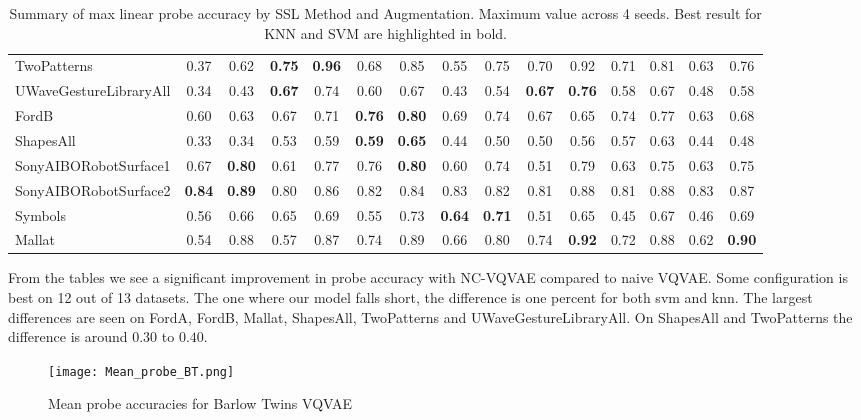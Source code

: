 \documentclass[../../thesis.tex]{subfiles}
\begin{document}
\begin{table}[H]
\begin{adjustbox}{width=\textwidth}
\begin{tabular}{lcc|cc|cc|cc|cc|cc|cc}
        TwoPatterns             & 0.37 & 0.62 & \textbf{0.75} & \textbf{0.96} & 0.68 & 0.85 & 0.55 & 0.75 & 0.70 & 0.92 & 0.71 & 0.81 & 0.63 & 0.76 \\
        UWaveGestureLibraryAll  & 0.34 & 0.43 & \textbf{0.67} & 0.74 & 0.60 & 0.67 & 0.43 & 0.54 & \textbf{0.67} & \textbf{0.76} & 0.58 & 0.67 & 0.48 & 0.58 \\
        FordB                   & 0.60 & 0.63 & 0.67 & 0.71 & \textbf{0.76} & \textbf{0.80} & 0.69 & 0.74 & 0.67 & 0.65 & 0.74 & 0.77 & 0.63 & 0.68 \\
        ShapesAll               & 0.33 & 0.34 & 0.53 & 0.59 & \textbf{0.59} & \textbf{0.65} & 0.44 & 0.50 & 0.50 & 0.56 & 0.57 & 0.63 & 0.44 & 0.48 \\
        SonyAIBORobotSurface1   & 0.67 & \textbf{0.80} & 0.61 & 0.77 & 0.76 & \textbf{0.80} & 0.60 & 0.74 & 0.51 & 0.79 & 0.63 & 0.75 & 0.63 & 0.75 \\
        SonyAIBORobotSurface2   & \textbf{0.84} & \textbf{0.89} & 0.80 & 0.86 & 0.82 & 0.84 & 0.83 & 0.82 & 0.81 & 0.88 & 0.81 & 0.88 & 0.83 & 0.87 \\
        Symbols                 & 0.56 & 0.66 & 0.65 & 0.69 & 0.55 & 0.73 & \textbf{0.64} & \textbf{0.71} & 0.51 & 0.65 & 0.45 & 0.67 & 0.46 & 0.69 \\
        Mallat                  & 0.54 & 0.88 & 0.57 & 0.87 & 0.74 & 0.89 & 0.66 & 0.80 & 0.74 & \textbf{0.92} & 0.72 & 0.88 & 0.62 & \textbf{0.90} \\


        \bottomrule
    \end{tabular}
    \end{adjustbox}
    
    \caption{Summary of max linear probe accuracy by SSL Method and Augmentation. Maximum value across 4 seeds. Best result for KNN and SVM are highlighted in bold.}
\end{table}

From the tables we see a significant improvement in probe accuracy with NC-VQVAE compared to naive VQVAE. Some configuration is best on 12 out of 13 datasets. The one where our model falls short, the difference is one percent for both svm and knn. The largest differences are seen on FordA, FordB, Mallat, ShapesAll, TwoPatterns and UWaveGestureLibraryAll. On ShapesAll and TwoPatterns the difference is around $0.30$ to $0.40$. 

\begin{figure}[H]
    \label{fig:Mean_probe_BT}
    \texttt{[image: Mean\_probe\_BT.png]}
    \centering  
    \caption{Mean probe accuracies for Barlow Twins VQVAE}
\end{figure}
\end{document}

